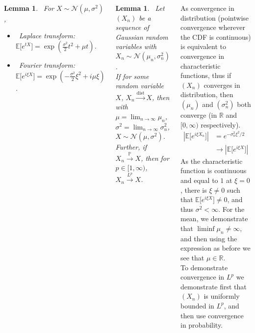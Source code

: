 \documentclass{tikzposter} %
\newcommand\rightopen[2]{\ensuremath{[#1,#2)}}
\newtheorem{lemma}[theorem]{Lemma}
\begin{document}
\begin{columns}
{    \begin{lemma}
    \ For $X \sim \mathcal{N}(\mu, \sigma^{2})$,
    \begin{itemize}
     \item \ Laplace transform: $\mathbb{E}\big[e^{tX}\big] = \exp{\left(\frac{\sigma^{2}}{2}t^{2} + \mu t\right)}$.
     \item \ Fourier transform: $\mathbb{E}\big[e^{i\xi X}\big] = \exp{\left(-\frac{\sigma^{2} }{2}\xi^{2}+i\mu\xi\right)}$.
    \end{itemize}
    \end{lemma}
    \hphantom{}

    \begin{lemma}
      \ Let $(X_{n})$ be a sequence of Gaussian random variables with $X_{n} \sim \mathcal{N}(\mu_{n},\sigma^{2}_{n})$. \\

      If for some random variable $X$, $X_{n}\overset{\mathrm{dist}}{\to} X$, then with $\displaystyle \mu = \lim_{n \to \infty} \mu_{n}$, $\displaystyle \sigma^{2} = \lim_{n \to \infty} \sigma^{2}_{n}$, $X \sim \mathcal{N}(\mu, \sigma^{2})$. \\

      Further, if $X_{n} \overset{\mathbb{P}}{\to} X$, then for $p \in \rightopen{1}{\infty}$, $X_{n} \overset{L^{p}}{\to} X$.
    \end{lemma}
    \hphantom{}

    As convergence in distribution (pointwise convergence wherever the CDF is continuous) is equivalent to convergence in characteristic functions, thus if $(X_{n})$ converges in distribution, then $(\mu_{n})$ and $(\sigma^{2}_{n})$ both converge (in $\mathbb{R}$ and $\rightopen{0}{\infty}$ respectively).
    \begin{align*}
      \left|\mathbb{E}\big[e^{i\xi X_{n}}\big]\right| &= e^{-\sigma_{n}^{2}\xi^{2}/2} \\
      &\to \left|\mathbb{E}\big[e^{i \xi X}\big]\right|
    \end{align*}
    As the characteristic function is continuous and equal to $1$ at $\xi = 0$, there is $\xi \neq 0$ such that $\mathbb{E}\big[e^{i\xi X}\big] \neq 0$, and thus $\sigma^{2} < \infty$. For the mean, we demonstrate that $\liminf \mu_{n} \neq \infty$, and then using the expression as before we see that $\mu \in \mathbb{R}$.\\

    To demonstrate convergence in $L^{p}$ we demonstrate first that $(X_{n})$ is uniformly bounded in $L^{p}$, and then use convergence in probability. \\

}
\end{columns}
\end{document}
